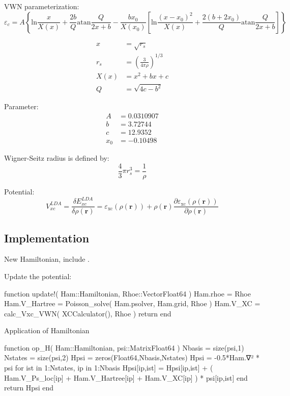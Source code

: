 VWN parameterization:
\begin{equation}
\varepsilon_{c} = A \left\{
\mathrm{ln}\frac{x}{X(x)} + \frac{2b}{Q}\mathrm{atan}\frac{Q}{2x+b}
- \frac{bx_{0}}{X(x_{0})}\left[
\mathrm{ln}\frac{(x - x_0)^2}{X(x)} + \frac{2(b + 2x_0)}{Q}\mathrm{atan}\frac{Q}{2x + b}
\right]
\right\}
\end{equation}

\begin{align}
x & = \sqrt{r_{s}} \\
r_s & = \left( \frac{3}{4\pi\rho} \right)^{1/3} \\
X(x) & = x^2 + bx + c \\
Q & = \sqrt{4c - b^2}
\end{align}

Parameter:
\begin{align}
A & = 0.0310907 \\
b & = 3.72744 \\
c & = 12.9352 \\
x_0 & = -0.10498
\end{align}

Wigner-Seitz radius is defined by:
\begin{equation}
\frac{4}{3}\pi r^{3}_{s} = \frac{1}{\rho}
\end{equation}

Potential:
\begin{equation}
V^{LDA}_{xc} = \frac{\delta E^{LDA}_{xc}}{\delta \rho(\mathbf{r})} = 
\varepsilon_{\mathrm{xc}}( \rho(\mathbf{r}) ) + \rho(\mathbf{r})
\frac{\partial \varepsilon_{\mathrm{xc}}( \rho(\mathbf{r}) )}{\partial\rho(\mathbf{r})}
\end{equation}


\subsection{Implementation}

New Hamiltonian, include .

Update the potential:

\begin{juliacode}
function update!( Ham::Hamiltonian, Rhoe::Vector{Float64} )
  Ham.rhoe = Rhoe
  Ham.V_Hartree = Poisson_solve( Ham.psolver, Ham.grid, Rhoe )
  Ham.V_XC = calc_Vxc_VWN( XCCalculator(), Rhoe )
  return
end
\end{juliacode}

Application of Hamiltonian

\begin{juliacode}
function op_H( Ham::Hamiltonian, psi::Matrix{Float64} )
  Nbasis = size(psi,1)
  Nstates = size(psi,2)
  Hpsi = zeros(Float64,Nbasis,Nstates)
  Hpsi = -0.5*Ham.∇² * psi
  for ist in 1:Nstates, ip in 1:Nbasis
    Hpsi[ip,ist] = Hpsi[ip,ist] + ( Ham.V_Ps_loc[ip] + Ham.V_Hartree[ip] +
                   Ham.V_XC[ip] ) * psi[ip,ist]
  end
  return Hpsi
end
\end{juliacode}

